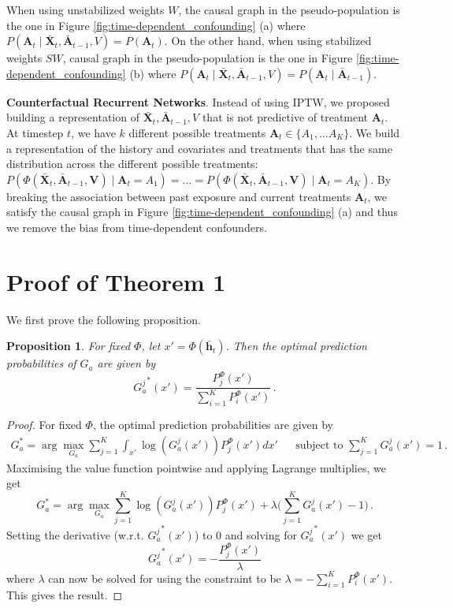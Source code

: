 \documentclass{article} %
\newtheorem{proposition}{Proposition}
\newcommand{\vc}[1]{\mathbf{#1}}
\newcommand{\hist}[1]{\bar{\vc{#1}}}
\begin{document}
	When using unstabilized weights $W$, the causal graph in the pseudo-population is the one in Figure \ref{fig:time-dependent_confounding} (a) where $P(\vc{A}_t \mid \hist{X}_t, \hist{A}_{t-1}, V) = P(\vc{A}_t)$. On the other hand, when using stabilized weights $SW$, causal graph in the pseudo-population is the one in Figure \ref{fig:time-dependent_confounding} (b) where $P(\vc{A}_t \mid \hist{X}_t, \hist{A}_{t-1}, V) = P(\vc{A}_t \mid \hist{A}_{t-1})$.
	
	\textbf{Counterfactual Recurrent Networks}. Instead of using IPTW, we proposed building a representation of $\hist{X}_t, \hist{A}_{t-1}, V$ that is not predictive of treatment $\vc{A}_t$. At timestep $t$, we have $k$ different possible treatments $\vc{A}_t \in \{ A_{1}, \dots A_{K} \}$. We build a representation of the history and covariates and treatments that has the same distribution across the different possible treatments: $P( \Phi(\hist{X}_t, \hist{A}_{t-1}, \vc{V})\mid \vc{A}_t = A_{1}) = \dots = P( \Phi(\hist{X}_t, \hist{A}_{t-1}, \vc{V})\mid \vc{A}_t = A_{K})$. By breaking the association between past exposure and current treatments $\vc{A}_t$, we satisfy the causal graph in Figure \ref{fig:time-dependent_confounding} (a) and thus we remove the bias from time-dependent confounders. 
	
	\newpage
    \section{Proof of Theorem 1} \label{apx:proof_theorem_1}
    We first prove the following proposition.
    \begin{proposition}
    For fixed $\Phi$, let $x' = \Phi(\bar{\vc{h}}_t)$. Then the optimal prediction probabilities of $G_a$ are given by
    \begin{equation}
        {G^j_a}^*(x') = \frac{P^\Phi_j(x')}{\sum_{i=1}^K P^\Phi_i(x')}\,.
    \end{equation}
    \end{proposition}
    \begin{proof}
    For fixed $\Phi$, the optimal prediction probabilities are given by
    \begin{align}
        G_a^* = \arg \max_{G_a} \sum_{j = 1}^K \int_{x'}
        \log(G_a^j(x')) P^\Phi_j(x')dx' &&
	     \text{subject to } \sum_{j = 1}^K G_a^j(x') = 1 \,.
    \end{align}
    Maximising the value function pointwise and applying Lagrange multiplies, we get
    \begin{equation}
        G_a^* = \arg \max_{G_a} \sum_{j = 1}^K
        \log(G_a^j(x')) P^\Phi_j(x') + \lambda \Bigg(\sum_{j = 1}^K G_a^j(x') - 1\Bigg)\,.
    \end{equation}
    Setting the derivative (w.r.t. ${G_a^j}^*(x')$) to $0$ and solving for ${G_a^j}^*(x')$ we get
    \begin{equation}
        {G_a^j}^*(x') = - \frac{P^\Phi_j(x')}{\lambda}
    \end{equation}
    where $\lambda$ can now be solved for using the constraint to be $\lambda = - \sum_{i=1}^K P^\Phi_i(x')$. This gives the result.
    \end{proof}
    
\end{document}
